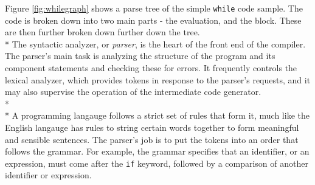 \documentclass[12pt]{report}
\begin{document}
Figure \ref{fig:whilegraph} shows a parse tree of the simple \texttt{while} code sample.  The code is broken down into two main parts - the evaluation, and the block.  These are then further broken down further down the tree.
\\*
The syntactic analyzer, or \textit{parser}, is the heart of the front end of the compiler.  The parser's main task is analyzing the structure of the program and its component statements and checking these for errors.  It frequently controls the lexical analyzer, which provides tokens in response to the parser's requests, and it may also supervise the operation of the intermediate code generator.\citep{compilerconstruction92}
\\*
\\*
A programming langauge follows a strict set of rules that form it, much like the English langauge has rules to string certain words together to form meaningful and sensible sentences.  The parser's job is to put the tokens into an order that follows the grammar.  For example, the grammar specifies that an identifier, or an expression, must come after the \texttt{if} keyword, followed by a comparison of another identifier or expression.
\end{document}
